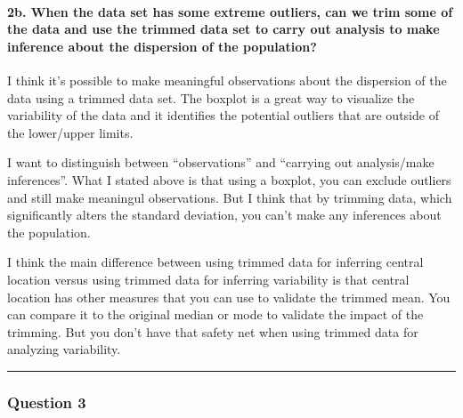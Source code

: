 \documentclass{article}
\begin{document}
    \paragraph{2b. When the data set has some extreme outliers, can we trim
some of the data and use the trimmed data set to carry out analysis to
make inference about the dispersion of the
population?}\label{b.-when-the-data-set-has-some-extreme-outliers-can-we-trim-some-of-the-data-and-use-the-trimmed-data-set-to-carry-out-analysis-to-make-inference-about-the-dispersion-of-the-population}

    I think it's possible to make meaningful observations about the
dispersion of the data using a trimmed data set. The boxplot is a great
way to visualize the variability of the data and it identifies the
potential outliers that are outside of the lower/upper limits.

I want to distinguish between ``observations'' and ``carrying out
analysis/make inferences''. What I stated above is that using a boxplot,
you can exclude outliers and still make meaningul observations. But I
think that by trimming data, which significantly alters the standard
deviation, you can't make any inferences about the population.

I think the main difference between using trimmed data for inferring
central location versus using trimmed data for inferring variability is
that central location has other measures that you can use to validate
the trimmed mean. You can compare it to the original median or mode to
validate the impact of the trimming. But you don't have that safety net
when using trimmed data for analyzing variability.

    \begin{center}\rule{3in}{0.4pt}\end{center}

\subsubsection{Question 3}\label{question-3}
\end{document}
